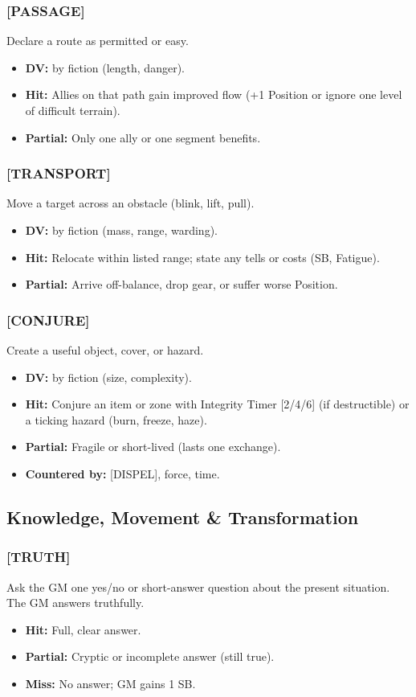 \subsubsection{[PASSAGE]}
Declare a route as permitted or easy.
\begin{itemize}
  \item \textbf{DV:} by fiction (length, danger).
  \item \textbf{Hit:} Allies on that path gain improved flow (+1 Position or ignore one level of difficult terrain).
  \item \textbf{Partial:} Only one ally or one segment benefits.
\end{itemize}

\subsubsection{[TRANSPORT]}
Move a target across an obstacle (blink, lift, pull).
\begin{itemize}
  \item \textbf{DV:} by fiction (mass, range, warding).
  \item \textbf{Hit:} Relocate within listed range; state any tells or costs (SB, Fatigue).
  \item \textbf{Partial:} Arrive off-balance, drop gear, or suffer worse Position.
\end{itemize}

\subsubsection{[CONJURE]}
Create a useful object, cover, or hazard.
\begin{itemize}
  \item \textbf{DV:} by fiction (size, complexity).
  \item \textbf{Hit:} Conjure an item or zone with Integrity Timer [2/4/6] (if destructible) or a ticking hazard (burn, freeze, haze).
  \item \textbf{Partial:} Fragile or short-lived (lasts one exchange).
  \item \textbf{Countered by:} [DISPEL], force, time.
\end{itemize}

\subsection{Knowledge, Movement \& Transformation}

\subsubsection{[TRUTH]}
Ask the GM one yes/no or short-answer question about the present situation. The GM answers truthfully.
\begin{itemize}
  \item \textbf{Hit:} Full, clear answer.
  \item \textbf{Partial:} Cryptic or incomplete answer (still true).
  \item \textbf{Miss:} No answer; GM gains 1 SB.
\end{itemize}

